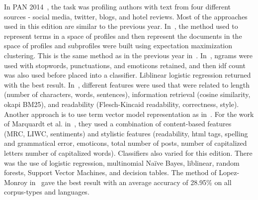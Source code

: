 \documentclass[a4paper]{llncs}
\begin{document}
In PAN 2014~\cite{rangel2014overview}, the task was profiling authors with text from four different sources - social media, twitter, blogs, and hotel reviews. Most of the approaches used in this edition are similar to the previous year. In~\cite{lopezusing}, the method used to represent terms in a space of profiles and then represent the documents in the space of profiles and subprofiles were built using expectation maximization clustering. This is the same method as in the previous year in~\cite{lopez2013inaoe}. In~\cite{maharjansimple}, ngrams were used with stopwords, punctuations, and emoticons retained, and then idf count was also used before placed into a classifier. Liblinear logistic regression returned with the best result. In~\cite{weren6exploring}, different features were used that were related to length (number of characters, words, sentences), information retrieval (cosine similarity, okapi BM25), and readability (Flesch-Kincaid readability, correctness, style). Another approach is to use term vector model representation as in~\cite{villenadaedalus}. For the work of Marquardt et al. in~\cite{marquardt2014age}, they used a combination of content-based features (MRC, LIWC, sentiments) and stylistic features (readability, html tags, spelling and grammatical error, emoticons, total number of posts, number of capitalized letters number of capitalized words). Classifiers also varied for this edition. There was the use of logistic regression, multinomial Naïve Bayes, liblinear, random forests, Support Vector Machines, and decision tables. The method of Lopez-Monroy in~\cite{lopezusing} gave the best result with an average accuracy of 28.95\% on all corpus-types and languages. 
\end{document}
